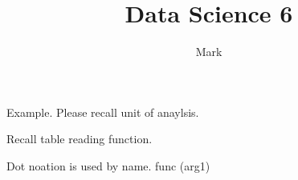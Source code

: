 \documentclass[11pt]{article}
\title{Data Science 6}
\author{Mark}
\date{}
\begin{document}
\maketitle

Example. Please recall unit of anaylsis. 

Recall table reading function.

Dot noation is used by name. func (arg1)
\end{document}
